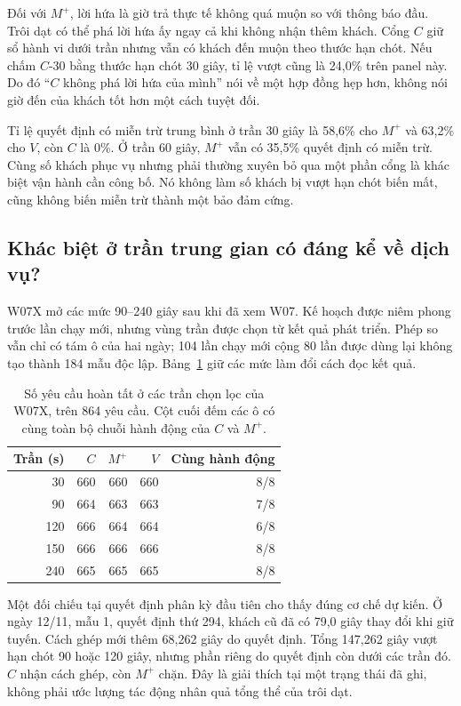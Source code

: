 Đối với $M^{+}$, lời hứa là giờ trả thực tế không quá muộn so với thông báo đầu.
Trôi dạt có thể phá lời hứa ấy ngay cả khi không nhận thêm khách. Cổng $C$
giữ sổ hành vi dưới trần nhưng vẫn có khách đến muộn theo thước hạn chót. Nếu
chấm $C$-30 bằng thước hạn chót 30 giây, tỉ lệ vượt cũng là 24,0\% trên panel
này. Do đó ``$C$ không phá lời hứa của mình'' nói về một hợp đồng hẹp hơn,
không nói giờ đến của khách tốt hơn một cách tuyệt đối.

Tỉ lệ quyết định có miễn trừ trung bình ở trần 30 giây là 58,6\% cho $M^{+}$
và 63,2\% cho $V$, còn $C$ là 0\%. Ở trần 60 giây, $M^{+}$ vẫn có 35,5\%
quyết định có miễn trừ. Cùng số khách phục vụ nhưng phải thường xuyên bỏ qua
một phần cổng là khác biệt vận hành cần công bố. Nó không làm số khách bị vượt
hạn chót biến mất, cũng không biến miễn trừ thành một bảo đảm cứng.

\subsection{Khác biệt ở trần trung gian có đáng kể về dịch vụ?}

W07X mở các mức 90--240 giây sau khi đã xem W07. Kế hoạch được niêm phong trước
lần chạy mới, nhưng vùng trần được chọn từ kết quả phát triển. Phép so vẫn chỉ
có tám ô của hai ngày; 104 lần chạy mới cộng 80 lần được dùng lại không tạo
thành 184 mẫu độc lập. Bảng~\ref{bang:w07x} giữ các mức làm đổi cách đọc kết quả.

\begin{table}[htbp]
\centering
\caption{Số yêu cầu hoàn tất ở các trần chọn lọc của W07X, trên 864 yêu cầu.
Cột cuối đếm các ô có cùng toàn bộ chuỗi hành động của $C$ và $M^{+}$.}
\label{bang:w07x}
\begin{tabular}{@{}rrrrr@{}}
\toprule
\textbf{Trần (s)} & \textbf{$C$} & \textbf{$M^{+}$} & \textbf{$V$} & \textbf{Cùng hành động}\\
\midrule
30 & 660 & 660 & 660 & 8/8\\
90 & 664 & 663 & 663 & 7/8\\
120 & 666 & 664 & 664 & 6/8\\
150 & 666 & 666 & 666 & 8/8\\
240 & 665 & 665 & 665 & 8/8\\
\bottomrule
\end{tabular}
\end{table}

Một đối chiếu tại quyết định phân kỳ đầu tiên cho thấy đúng cơ chế dự kiến.
Ở ngày 12/11, mẫu 1, quyết định thứ 294, khách cũ đã có 79,0 giây thay đổi khi
giữ tuyến. Cách ghép mới thêm 68,262 giây do quyết định. Tổng 147,262 giây vượt
hạn chót 90 hoặc 120 giây, nhưng phần riêng do quyết định còn dưới các trần đó.
$C$ nhận cách ghép, còn $M^{+}$ chặn. Đây là giải thích tại một trạng thái đã
ghi, không phải ước lượng tác động nhân quả tổng thể của trôi dạt.

